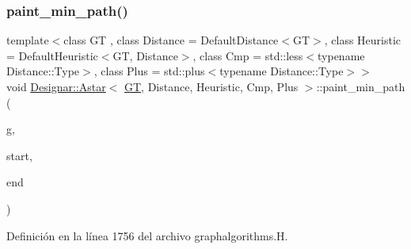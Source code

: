 \subsubsection{\texorpdfstring{paint\+\_\+min\+\_\+path()}{paint\_min\_path()}}
{\footnotesize\ttfamily template$<$class GT , class Distance  = Default\+Distance$<$\+G\+T$>$, class Heuristic  = Default\+Heuristic$<$\+G\+T, Distance$>$, class Cmp  = std\+::less$<$typename Distance\+::\+Type$>$, class Plus  = std\+::plus$<$typename Distance\+::\+Type$>$$>$ \\
void \hyperlink{class_designar_1_1_astar}{Designar\+::\+Astar}$<$ \hyperlink{demo-buildgraph_8_c_a3001c40d2c31ca87ed96cd7d1334a55e}{GT}, Distance, Heuristic, Cmp, Plus $>$\+::paint\+\_\+min\+\_\+path (\begin{DoxyParamCaption}\item[{\hyperlink{demo-buildgraph_8_c_a3001c40d2c31ca87ed96cd7d1334a55e}{GT} \&}]{g,  }\item[{\hyperlink{class_designar_1_1_astar_a0d4cdf6b94255824c6c93e5ae18e9eb7}{Node} \&}]{start,  }\item[{\hyperlink{class_designar_1_1_astar_a0d4cdf6b94255824c6c93e5ae18e9eb7}{Node} \&}]{end }\end{DoxyParamCaption})\hspace{0.3cm}{\ttfamily [inline]}}



Definición en la línea 1756 del archivo graphalgorithms.\+H.

\mbox{\label{class_designar_1_1_astar_a23f41f4dd26aaef8ded7138de8866b54}} 
